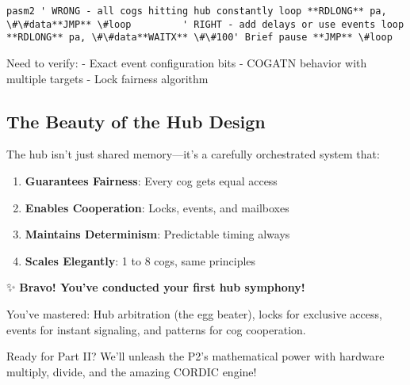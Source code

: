 \documentclass[11pt]{book}
\providecommand{\tightlist}{%
  \setlength{\itemsep}{0pt}\setlength{\parskip}{0pt}}
\providecommand{\passthrough}[1]{#1}
\begin{document}
\passthrough{\lstinline!pasm2 ' WRONG - all cogs hitting hub constantly loop **RDLONG** pa, \#\#data**JMP** \#loop         ' RIGHT - add delays or use events loop **RDLONG** pa, \#\#data**WAITX** \#\#100' Brief pause **JMP** \#loop!}

\begin{review}
Need to verify:
- Exact event configuration bits
- COGATN behavior with multiple targets
- Lock fairness algorithm
\end{review}

\hypertarget{the-beauty-of-the-hub-design}{%
\subsection{The Beauty of the Hub
Design}\label{the-beauty-of-the-hub-design}}

The hub isn't just shared memory---it's a carefully orchestrated system
that:

\begin{enumerate}
\def\labelenumi{\arabic{enumi}.}
\tightlist
\item
  \textbf{Guarantees Fairness}: Every cog gets equal access
\item
  \textbf{Enables Cooperation}: Locks, events, and mailboxes
\item
  \textbf{Maintains Determinism}: Predictable timing always
\item
  \textbf{Scales Elegantly}: 1 to 8 cogs, same principles
\end{enumerate}

\begin{chapterend}
✨ \textbf{Bravo! You've conducted your first hub symphony!}

You've mastered: Hub arbitration (the egg beater), locks for exclusive access, events for instant signaling, and patterns for cog cooperation.

\chapterseparator

Ready for Part II? We'll unleash the P2's mathematical power with hardware multiply, divide, and the amazing CORDIC engine!
\end{chapterend}
\end{document}
